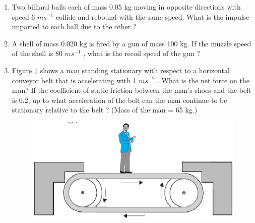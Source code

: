 \begin{enumerate}[label=\arabic*.,ref=\thesection.\theenumi]
\item Two billiard balls each of mass 0.05 kg moving in opposite directions with speed 6 $m s^{-1}$ collide and rebound with the same speed. What is the impulse imparted to each ball due to the other ?
\item  A shell of mass 0.020 kg is fired by a gun of mass 100 kg. If the muzzle speed of the shell is 80 $m s^{-1}$
, what is the recoil speed of the gun ?
\item Figure \ref{fig:5.18} shows a man standing stationary with respect to a horizontal conveyor belt that is accelerating with 1 $m s^{-2}$
. What is the net force on the man? If the
coefficient of static friction between the man's shoes and the belt is 0.2, up to what acceleration of the belt can the man continue to be stationary relative to the belt ? (Mass of the man = 65 kg.)
\begin{figure}[!ht]
\centering
\includegraphics[width=\columnwidth]{./figs/11-1/5/5.18.eps}
\caption{}
\label{fig:5.18}
\end{figure} 


\end{enumerate}
